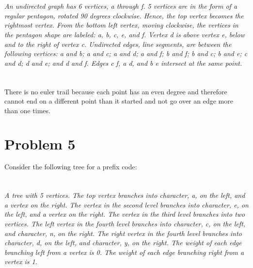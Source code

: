 \begin{enumerate}[label=(\alph*)]
\begin{enumerate}[label=(\roman*)]
{}
\\\\
{\color{blue}{\bf Figure 12:} \emph{An undirected graph has 6 vertices, a through f. 5 vertices are in the form of a regular pentagon, rotated 90 degrees clockwise. Hence, the top vertex becomes the rightmost vertex. From the bottom left vertex, moving clockwise, the vertices in the pentagon shape are labeled: a, b, c, e, and f. Vertex d is above vertex e, below and to the right of vertex c. Undirected edges, line segments, are between the following vertices: a and b; a and c; a and d; a and f; b and f; b and c; b and e; c and d; d and e; and d and f. Edges c f, a d, and b e intersect at the same point.
\\
}
}
\\\\
There is no euler trail because each point has an even degree and therefore cannot end on a different point than it started and not go over an edge more than one times.
\end{enumerate}
\end{enumerate}
 \newpage

\section*{Problem 5}

Consider the following tree for a prefix code:\\
\\\\
{\color{blue}{\bf Figure 13:} \emph{A tree with 5 vertices. The top vertex branches into character, a, on the left, and a vertex on the right. The vertex in the second level branches into character, e, on the left, and a vertex on the right. The vertex in the third level branches into two vertices. The left vertex in the fourth level branches into character, c, on the left, and character, n, on the right. The right vertex in the fourth level branches into character, d, on the left, and character, y, on the right. The weight of each edge branching left from a vertex is 0. The weight of each edge branching right from a vertex is 1.
\\
}
}
\\
\\

